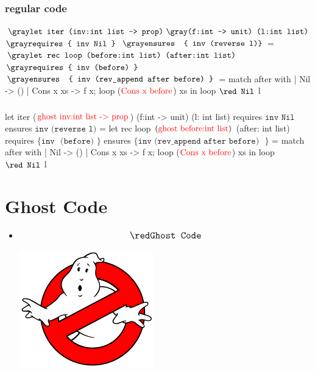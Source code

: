 \documentclass[xcolor=dvipsnames]{beamer}
\begin{document}
\begin{frame}[fragile]
\frametitle{regular code}
\begin{footnotesize}
\begin{whycode}
${\gray\texttt{let iter (inv:int list -> prop)}} ~
{\gray\texttt{(f:int -> unit) (l:int list)}}$
${\gray\texttt{requires \{ inv Nil \}}}$
${\gray\texttt{ensures~ \{ inv (reverse l)\}}}$    
= ${\gray\texttt{let rec loop (before:int list) (after:int list)}}$
  ${\gray\texttt{requires \{ inv (before) \} }}$
  ${\gray\texttt{ensures~ \{ inv (rev\_append after before) \}}}$
  = match after with 
     | Nil       -> ()
     | Cons x xs -> f x; loop ($\textcolor{red}{\text{Cons x before}}$) xs 
  in loop $\texttt{\red Nil}$ l 
\end{whycode}
\end{footnotesize}
\end{frame}
\addtocounter{framenumber}{-1}

\begin{frame}[fragile]
\frametitle{}
\begin{footnotesize}
\begin{whycode}
let iter ($\textcolor{red}{\text{ghost inv:int list -> prop}}$) (f:int -> unit) (l: int list)
requires { ${ \texttt{inv Nil}}$ }
ensures  { ${ \texttt{inv (reverse l)}}$ }
= let rec loop $(\textcolor{red}{\text{ghost before:int list}})$ (after: int list) 
  requires $\texttt{\{ inv { (before)} \}}$
  ensures  $\texttt{\{ inv {(rev\_append after before)} }\}$     
  = match after with 
     | Nil       -> ()
     | Cons x xs -> f x; loop ($\textcolor{red}{\text{Cons x before}}$) xs 
  in loop $\texttt{\red Nil}$ l 
\end{whycode}
\end{footnotesize}
\end{frame}
\addtocounter{framenumber}{-1}



\section*{Ghost Code}

\begin{frame}
 \begin{itemize}
 	\item[] $${\large \red \texttt{Ghost Code}}$$
 	\begin{center}
 	\includegraphics[scale=0.31]{GhostBusters}
 	\end{center} 
 \end{itemize}
\end{frame}
\addtocounter{framenumber}{-1}
\end{document}
